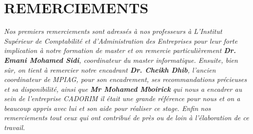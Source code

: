 \documentclass[a4paper, 12pt]{report}
\begin{document}
		\chapter*{REMERCIEMENTS} \label{chap:1REMERCIEMENTS}
		\textit{
			Nos premiers remerciements sont adressés à nos professeurs à L’Institut Supérieur de Comptabilité et d’Administration des Entreprises pour leur forte implication à notre formation de
			master et on remercie particulièrement \textbf{Dr. Emani Mohamed Sidi},
			coordinateur du master informatique. Ensuite, bien sûr, on tient à remercier
			notre encadrant \textbf{Dr. Cheikh Dhib}, l'ancien coordinateur de MPIAG, pour son encadrement, ses recommandations
			précieuses et sa disponibilité, ainsi que \textbf{Mr Mohamed Mboirick} qui nous a
			encadrer au sein de l’entreprise CADORIM il était une grande référence pour
			nous et on a beaucoup appris avec lui et son aide pour réaliser ce stage. Enfin
			nos remerciements tout ceux qui ont contribué de près ou de loin à
			l'élaboration de ce travail.
		}
\end{document}
